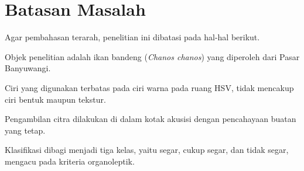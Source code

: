 \section{Batasan Masalah}

Agar pembahasan terarah, penelitian ini dibatasi pada hal-hal berikut.
\begin{packed_enum}
  \item Objek penelitian adalah ikan bandeng (\textit{Chanos chanos})
        yang diperoleh dari Pasar Banyuwangi.
  \item Ciri yang digunakan terbatas pada ciri warna pada ruang HSV,
        tidak mencakup ciri bentuk maupun tekstur.
  \item Pengambilan citra dilakukan di dalam kotak akusisi dengan
        pencahayaan buatan yang tetap.
  \item Klasifikasi dibagi menjadi tiga kelas, yaitu segar, cukup segar,
        dan tidak segar, mengacu pada kriteria organoleptik.
\end{packed_enum}
